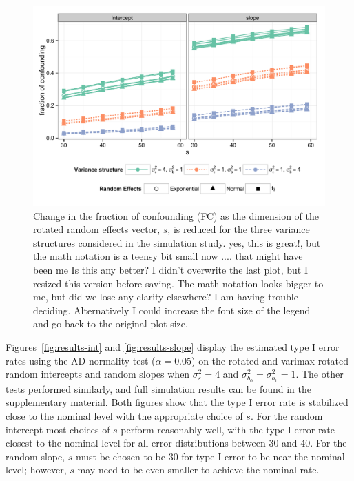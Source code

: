 \documentclass[12pt]{article} %
\newcommand{\hh}[1]{{\color{orange} #1}}
\newcommand{\al}[1]{{\color{red} #1}}
\begin{document}
\begin{figure}[h]
	\centering
	\includegraphics[width=\textwidth]{fc_by_s_trial.pdf}
	\caption{\label{fig:fc} Change in the fraction of confounding (FC) as the dimension of the rotated random effects vector, $s$, is reduced for the three variance structures considered in the simulation study. %
	\hh{yes, this is great!, but the math notation is a teensy bit small now .... that might have been me}
	\al{Is this any better? I didn't overwrite the last plot, but I resized this version before saving. The math notation looks bigger to me, but did we lose any clarity elsewhere? I am having trouble deciding. Alternatively I could increase the font size of the legend and go back to the original plot size.}
	}
\end{figure}

Figures~\ref{fig:results-int} and \ref{fig:results-slope} display the estimated type I error rates using the AD normality test ($\alpha = 0.05$) on the rotated and varimax rotated random intercepts and random slopes when $\sigma^2_\varepsilon = 4$ and $\sigma^2_{b_0} = \sigma^2_{b_1} = 1$. The other tests performed similarly, and full simulation results can be found in the supplementary material. Both figures show that the type I error rate is stabilized close to the nominal level with the appropriate choice of $s$. For the random intercept most choices of $s$ perform reasonably well, with the type I error rate closest to the nominal level for all error distributions between 30 and 40. For the random slope, $s$ must be chosen to be 30 for type I error to be near the nominal level; however, $s$ may need to be even smaller to achieve the nominal rate. 
\end{document}
